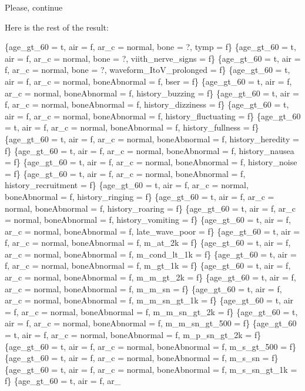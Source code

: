 \documentclass[12pt]{article}
\begin{document}
Please, continue

\begin{mdframed}

Here is the rest of the result:
\newline

    \{age\_gt\_60 = t, air = f, ar\_c = normal, bone = ?, tymp = f\}
    \{age\_gt\_60 = t, air = f, ar\_c = normal, bone = ?, viith\_nerve\_signs = f\}
    \{age\_gt\_60 = t, air = f, ar\_c = normal, bone = ?, waveform\_ItoV\_prolonged = f\}
    \{age\_gt\_60 = t, air = f, ar\_c = normal, boneAbnormal = f, bser = f\}
    \{age\_gt\_60 = t, air = f, ar\_c = normal, boneAbnormal = f, history\_buzzing = f\}
    \{age\_gt\_60 = t, air = f, ar\_c = normal, boneAbnormal = f, history\_dizziness = f\}
    \{age\_gt\_60 = t, air = f, ar\_c = normal, boneAbnormal = f, history\_fluctuating = f\}
    \{age\_gt\_60 = t, air = f, ar\_c = normal, boneAbnormal = f, history\_fullness = f\}
    \{age\_gt\_60 = t, air = f, ar\_c = normal, boneAbnormal = f, history\_heredity = f\}
    \{age\_gt\_60 = t, air = f, ar\_c = normal, boneAbnormal = f, history\_nausea = f\}
    \{age\_gt\_60 = t, air = f, ar\_c = normal, boneAbnormal = f, history\_noise = f\}
    \{age\_gt\_60 = t, air = f, ar\_c = normal, boneAbnormal = f, history\_recruitment = f\}
    \{age\_gt\_60 = t, air = f, ar\_c = normal, boneAbnormal = f, history\_ringing = f\}
    \{age\_gt\_60 = t, air = f, ar\_c = normal, boneAbnormal = f, history\_roaring = f\}
    \{age\_gt\_60 = t, air = f, ar\_c = normal, boneAbnormal = f, history\_vomiting = f\}
    \{age\_gt\_60 = t, air = f, ar\_c = normal, boneAbnormal = f, late\_wave\_poor = f\}
    \{age\_gt\_60 = t, air = f, ar\_c = normal, boneAbnormal = f, m\_at\_2k = f\}
    \{age\_gt\_60 = t, air = f, ar\_c = normal, boneAbnormal = f, m\_cond\_lt\_1k = f\}
    \{age\_gt\_60 = t, air = f, ar\_c = normal, boneAbnormal = f, m\_gt\_1k = f\}
    \{age\_gt\_60 = t, air = f, ar\_c = normal, boneAbnormal = f, m\_m\_gt\_2k = f\}
    \{age\_gt\_60 = t, air = f, ar\_c = normal, boneAbnormal = f, m\_m\_sn = f\}
    \{age\_gt\_60 = t, air = f, ar\_c = normal, boneAbnormal = f, m\_m\_sn\_gt\_1k = f\}
    \{age\_gt\_60 = t, air = f, ar\_c = normal, boneAbnormal = f, m\_m\_sn\_gt\_2k = f\}
    \{age\_gt\_60 = t, air = f, ar\_c = normal, boneAbnormal = f, m\_m\_sn\_gt\_500 = f\}
    \{age\_gt\_60 = t, air = f, ar\_c = normal, boneAbnormal = f, m\_p\_sn\_gt\_2k = f\}
    \{age\_gt\_60 = t, air = f, ar\_c = normal, boneAbnormal = f, m\_s\_gt\_500 = f\}
    \{age\_gt\_60 = t, air = f, ar\_c = normal, boneAbnormal = f, m\_s\_sn = f\}
    \{age\_gt\_60 = t, air = f, ar\_c = normal, boneAbnormal = f, m\_s\_sn\_gt\_1k = f\}
    \{age\_gt\_60 = t, air = f, ar\_
\end{mdframed}
\end{document}
